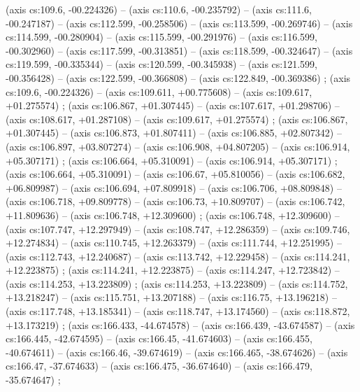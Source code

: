     (axis cs:109.6,    -00.224326) --  (axis cs:110.6,    -00.235792) --  (axis cs:111.6,    -00.247187) --  (axis cs:112.599,    -00.258506) --  (axis cs:113.599,    -00.269746) --  (axis cs:114.599,    -00.280904) --  (axis cs:115.599,    -00.291976) --  (axis cs:116.599,    -00.302960) --  (axis cs:117.599,    -00.313851) --  (axis cs:118.599,    -00.324647) --  (axis cs:119.599,    -00.335344) --  (axis cs:120.599,    -00.345938) --  (axis cs:121.599,    -00.356428) --  (axis cs:122.599,    -00.366808) --  (axis cs:122.849,    -00.369386) ;
    (axis cs:109.6,    -00.224326) --  (axis cs:109.611,    +00.775608) --  (axis cs:109.617,    +01.275574) ;
    (axis cs:106.867,    +01.307445) --  (axis cs:107.617,    +01.298706) --  (axis cs:108.617,    +01.287108) --  (axis cs:109.617,    +01.275574) ;
    (axis cs:106.867,    +01.307445) --  (axis cs:106.873,    +01.807411) --  (axis cs:106.885,    +02.807342) --  (axis cs:106.897,    +03.807274) --  (axis cs:106.908,    +04.807205) --  (axis cs:106.914,    +05.307171) ;
    (axis cs:106.664,    +05.310091) --  (axis cs:106.914,    +05.307171) ;
    (axis cs:106.664,    +05.310091) --  (axis cs:106.67,    +05.810056) --  (axis cs:106.682,    +06.809987) --  (axis cs:106.694,    +07.809918) --  (axis cs:106.706,    +08.809848) --  (axis cs:106.718,    +09.809778) --  (axis cs:106.73,    +10.809707) --  (axis cs:106.742,    +11.809636) --  (axis cs:106.748,    +12.309600) ;
    (axis cs:106.748,    +12.309600) --  (axis cs:107.747,    +12.297949) --  (axis cs:108.747,    +12.286359) --  (axis cs:109.746,    +12.274834) --  (axis cs:110.745,    +12.263379) --  (axis cs:111.744,    +12.251995) --  (axis cs:112.743,    +12.240687) --  (axis cs:113.742,    +12.229458) --  (axis cs:114.241,    +12.223875) ;
    (axis cs:114.241,    +12.223875) --  (axis cs:114.247,    +12.723842) --  (axis cs:114.253,    +13.223809) ;
    (axis cs:114.253,    +13.223809) --  (axis cs:114.752,    +13.218247) --  (axis cs:115.751,    +13.207188) --  (axis cs:116.75,    +13.196218) --  (axis cs:117.748,    +13.185341) --  (axis cs:118.747,    +13.174560) --  (axis cs:118.872,    +13.173219) ;
    (axis cs:166.433,    -44.674578) --  (axis cs:166.439,    -43.674587) --  (axis cs:166.445,    -42.674595) --  (axis cs:166.45,    -41.674603) --  (axis cs:166.455,    -40.674611) --  (axis cs:166.46,    -39.674619) --  (axis cs:166.465,    -38.674626) --  (axis cs:166.47,    -37.674633) --  (axis cs:166.475,    -36.674640) --  (axis cs:166.479,    -35.674647) ;
